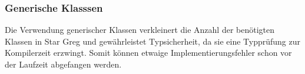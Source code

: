 \subsubsection{Generische Klasssen}
\label{subsub:fachkonzept-implementierung-erlaeuterung-generisch}

Die Verwendung generischer Klassen verkleinert die Anzahl der benötigten Klassen in Star Greg und gewährleistet Typsicherheit, da sie eine Typprüfung zur Kompilerzeit erzwingt. Somit können etwaige Implementierungsfehler schon vor der Laufzeit abgefangen werden.  

